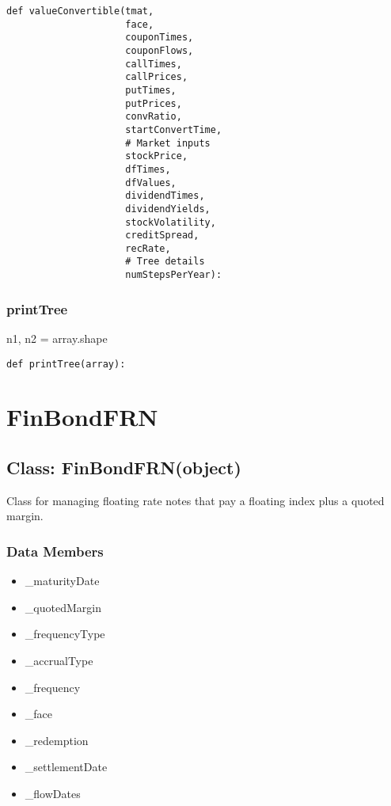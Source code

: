 \documentclass[twoside,11pt]{book}
\begin{document}
\begin{lstlisting}
def valueConvertible(tmat,
                     face,
                     couponTimes,
                     couponFlows,
                     callTimes,
                     callPrices,
                     putTimes,
                     putPrices,
                     convRatio,
                     startConvertTime,
                     # Market inputs
                     stockPrice,
                     dfTimes,
                     dfValues,
                     dividendTimes,
                     dividendYields,
                     stockVolatility,
                     creditSpread,
                     recRate,
                     # Tree details
                     numStepsPerYear):
\end{lstlisting}

\subsubsection*{{\bf printTree}}
n1, n2 = array.shape 

\begin{lstlisting}
def printTree(array):
\end{lstlisting}

\newpage
\section{FinBondFRN}

\subsection*{Class: FinBondFRN(object)}
Class for managing floating rate notes that pay a floating index plus a quoted margin. 

\subsubsection*{Data Members}
\begin{itemize}
\item{\_maturityDate}
\item{\_quotedMargin}
\item{\_frequencyType}
\item{\_accrualType}
\item{\_frequency}
\item{\_face}
\item{\_redemption}
\item{\_settlementDate}
\item{\_flowDates}
\end{itemize}
\end{document}
